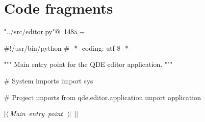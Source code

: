 \documentclass[%
    a4paper,    %
    justified,  %
    nobib,      %
    openany     %
]{tufte-book}
\begin{document}

\section{Code fragments}
\label{sec:code-fragments}

\begin{flushleft} \small
\begin{minipage}{\linewidth}\label{scrap166}\raggedright\small
{} \verb@"../src/editor.py"@\nobreak\ {\footnotesize {148a}}$\equiv$
\vspace{-1ex}
\begin{pythoncode}
#!/usr/bin/python
# -*- coding: utf-8 -*-

""" Main entry point for the QDE editor application. """

# System imports
import sys

# Project imports
from qde.editor.application import application

|\hbox{$\langle\,${\itshape Main entry point}\nobreak\ {\footnotesize {}}$\,\rangle$}|
|\NWsep|
\end{pythoncode}
\vspace{1.5ex}
\footnotesize
\begin{list}{}{\setlength{\itemsep}{-\parsep}\setlength{\itemindent}{-\leftmargin}}

\item{}
\end{list}
\end{minipage}\vspace{4ex}
\end{flushleft}
\end{document}
